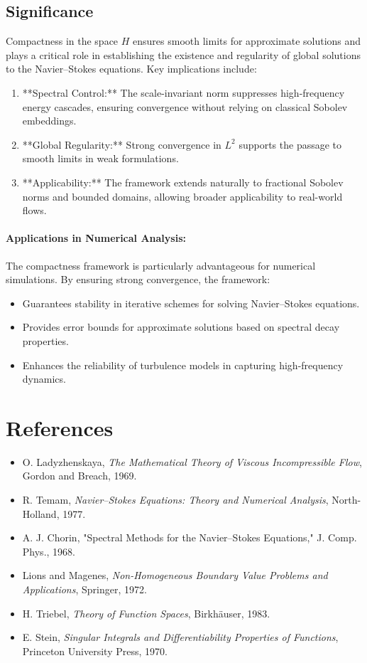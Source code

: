 \subsection{Significance}
Compactness in the space $H$ ensures smooth limits for approximate solutions and plays a critical role in establishing the existence and regularity of global solutions to the Navier--Stokes equations. Key implications include:
\begin{enumerate}
    \item **Spectral Control:** The scale-invariant norm suppresses high-frequency energy cascades, ensuring convergence without relying on classical Sobolev embeddings.
    \item **Global Regularity:** Strong convergence in $L^2$ supports the passage to smooth limits in weak formulations.
    \item **Applicability:** The framework extends naturally to fractional Sobolev norms and bounded domains, allowing broader applicability to real-world flows.
\end{enumerate}

\paragraph{Applications in Numerical Analysis:}
The compactness framework is particularly advantageous for numerical simulations. By ensuring strong convergence, the framework:
\begin{itemize}
    \item Guarantees stability in iterative schemes for solving Navier--Stokes equations.
    \item Provides error bounds for approximate solutions based on spectral decay properties.
    \item Enhances the reliability of turbulence models in capturing high-frequency dynamics.
\end{itemize}

\section*{References}
\begin{itemize}
    \item O. Ladyzhenskaya, \emph{The Mathematical Theory of Viscous Incompressible Flow}, Gordon and Breach, 1969.
    \item R. Temam, \emph{Navier--Stokes Equations: Theory and Numerical Analysis}, North-Holland, 1977.
    \item A. J. Chorin, "Spectral Methods for the Navier--Stokes Equations," J. Comp. Phys., 1968.
    \item Lions and Magenes, \emph{Non-Homogeneous Boundary Value Problems and Applications}, Springer, 1972.
    \item H. Triebel, \emph{Theory of Function Spaces}, Birkh\"auser, 1983.
    \item E. Stein, \emph{Singular Integrals and Differentiability Properties of Functions}, Princeton University Press, 1970.
\end{itemize}


